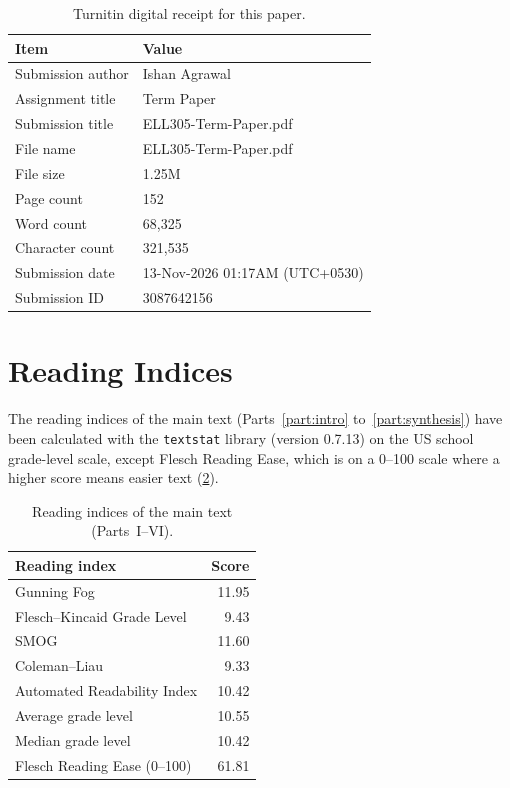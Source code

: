 \begin{table}[htbp]
    \centering
    \caption[Turnitin digital receipt]{Turnitin digital receipt for this paper.}
    \label{tab:turnitin-receipt}
    \begin{tabular}{@{}ll@{}}
        \toprule
        \textbf{Item} & \textbf{Value} \\
        \midrule
        Submission author & Ishan Agrawal \\
        Assignment title & Term Paper \\
        Submission title & ELL305-Term-Paper.pdf \\
        File name & ELL305-Term-Paper.pdf \\
        File size & 1.25M \\
        Page count & 152 \\
        Word count & 68,325 \\
        Character count & 321,535 \\
        Submission date & 13-Nov-2026 01:17AM (UTC+0530) \\
        Submission ID & 3087642156 \\
        \bottomrule
    \end{tabular}
\end{table}
\clearpage
\section{Reading Indices}
\label{app:reading-indices}

The reading indices of the main text (Parts~\ref{part:intro} to~\ref{part:synthesis}) have been calculated with the \texttt{textstat} library (version 0.7.13) on the US school grade-level scale, except Flesch Reading Ease, which is on a 0--100 scale where a higher score means easier text (\cref{tab:reading-indices}).

\begin{table}[htbp]
    \centering
    \caption[Reading indices of the main text]{Reading indices of the main text (Parts~I--VI).}
    \label{tab:reading-indices}
    \begin{tabular}{@{}lr@{}}
        \toprule
        \textbf{Reading index} & \textbf{Score} \\
        \midrule
        Gunning Fog & 11.95 \\
        Flesch--Kincaid Grade Level & 9.43 \\
        SMOG & 11.60 \\
        Coleman--Liau & 9.33 \\
        Automated Readability Index & 10.42 \\
        \midrule
        Average grade level & 10.55 \\
        Median grade level & 10.42 \\
        \midrule
        Flesch Reading Ease (0--100) & 61.81 \\
        \bottomrule
    \end{tabular}
\end{table}
\clearpage
